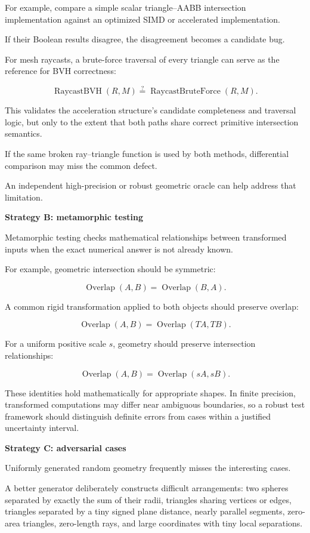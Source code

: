 For example, compare a simple scalar triangle--AABB intersection implementation against an optimized SIMD or accelerated implementation.

If their Boolean results disagree, the disagreement becomes a candidate bug.

For mesh raycasts, a brute-force traversal of every triangle can serve as the reference for BVH correctness:

\[
\operatorname{RaycastBVH}(R,M) \stackrel{?}{=} \operatorname{RaycastBruteForce}(R,M).
\]

This validates the acceleration structure's candidate completeness and traversal logic, but only to the extent that both paths share correct primitive intersection semantics.

If the same broken ray--triangle function is used by both methods, differential comparison may miss the common defect.

An independent high-precision or robust geometric oracle can help address that limitation.

\textbf{Strategy B: metamorphic testing}

Metamorphic testing checks mathematical relationships between transformed inputs when the exact numerical answer is not already known.

For example, geometric intersection should be symmetric:

\[
\operatorname{Overlap}(A,B) = \operatorname{Overlap}(B,A).
\]

A common rigid transformation applied to both objects should preserve overlap:

\[
\operatorname{Overlap}(A,B) = \operatorname{Overlap}(TA,TB).
\]

For a uniform positive scale \(s\), geometry should preserve intersection relationships:

\[
\operatorname{Overlap}(A,B) = \operatorname{Overlap}(sA,sB).
\]

These identities hold mathematically for appropriate shapes. In finite precision, transformed computations may differ near ambiguous boundaries, so a robust test framework should distinguish definite errors from cases within a justified uncertainty interval.

\textbf{Strategy C: adversarial cases}

Uniformly generated random geometry frequently misses the interesting cases.

A better generator deliberately constructs difficult arrangements: two spheres separated by exactly the sum of their radii, triangles sharing vertices or edges, triangles separated by a tiny signed plane distance, nearly parallel segments, zero-area triangles, zero-length rays, and large coordinates with tiny local separations.

